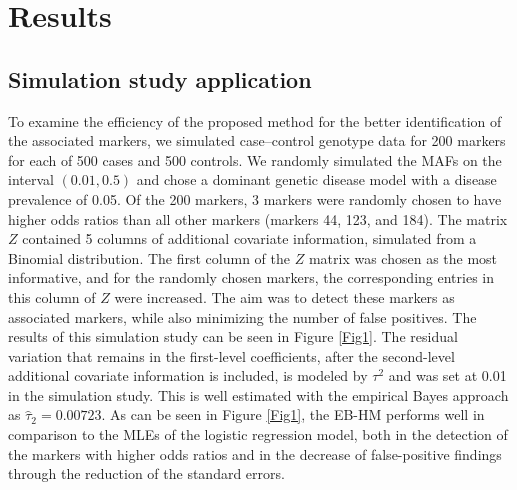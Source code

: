 \documentclass[oupdraft]{bio}
\begin{document}
\section{Results}
\label{sec3}

\subsection{Simulation study application}

To examine the efficiency of the proposed method for the better
identification of the associated markers, we simulated
case--control genotype data for 200 markers for each of 500
cases and 500 controls. We randomly simulated the MAFs on the
interval $(0.01, 0.5)$ and chose a dominant genetic disease
model with a disease prevalence of 0.05. Of the 200 markers,
3 markers were randomly chosen to have higher odds ratios
than all other markers (markers 44, 123, and 184). The matrix
$Z$ contained 5 columns of additional covariate information,
simulated from a Binomial distribution. The first column of
the $Z$ matrix was chosen as the most informative, and for
the randomly chosen markers, the corresponding entries in
this column of $Z$ were increased. The aim was to detect these
markers as associated markers, while also minimizing the
number of false positives. The results of this simulation
study can be seen in Figure \ref{Fig1}. The residual variation
that remains in the first-level coefficients, after the
second-level additional covariate information is included, is
modeled by $\tau^2$ and was set at 0.01 in the simulation
study. This is well estimated with the empirical Bayes approach
as $\hat{\tau}_2 = 0.00723$. As can be seen in Figure \ref{Fig1},
the EB-HM performs well in comparison to the MLEs of the
logistic regression model, both in the detection of the
markers with higher odds ratios and in the decrease of
false-positive findings through the reduction of the
standard errors.
\end{document}
